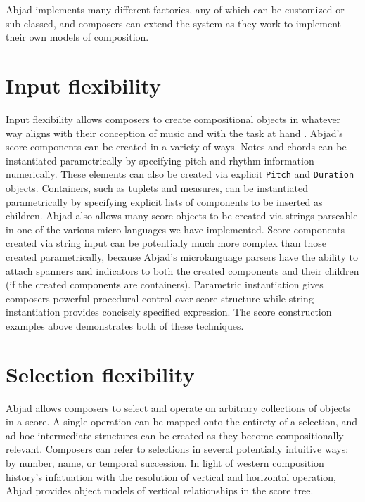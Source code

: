 \documentclass{article}
\begin{document}
\noindent Abjad implements many different factories, any of which can be
customized or sub-classed, and composers can extend the system as they work to
implement their own models of composition.

\section{Input flexibility} \label{sec:input-flexibility}

Input flexibility allows composers to create compositional objects in whatever
way aligns with their conception of music and with the task at hand
\cite{Kay:1996vn}. Abjad's score components can be created in a variety of
ways. Notes and chords can be instantiated parametrically by specifying
pitch and rhythm information numerically. These elements can also be created via
explicit \texttt{Pitch} and \texttt{Duration} objects. Containers, such as
tuplets and measures, can be instantiated parametrically by specifying explicit
lists of components to be inserted as children. Abjad also allows many score
objects to be created via strings parseable in one of the various
micro-languages we have implemented. Score components created via string input
can be potentially much more complex than those created parametrically, because
Abjad's microlanguage parsers have the ability to attach spanners and
indicators to both the created components and their children (if the created
components are containers). Parametric instantiation gives composers powerful
procedural control over score structure while string instantiation provides
concisely specified expression. The score construction examples above
demonstrates both of these techniques.

\section{Selection flexibility} \label{sec:selection-flexibility}

Abjad allows composers to select and operate on arbitrary collections of
objects in a score. A single operation can be mapped onto the entirety of a
selection, and ad hoc intermediate structures can be created as they become
compositionally relevant. Composers can refer to selections in several
potentially intuitive ways: by number, name, or temporal succession. In light
of western composition history's infatuation with the resolution of vertical
and horizontal operation, Abjad provides object models of vertical
relationships in the score tree.
\end{document}
